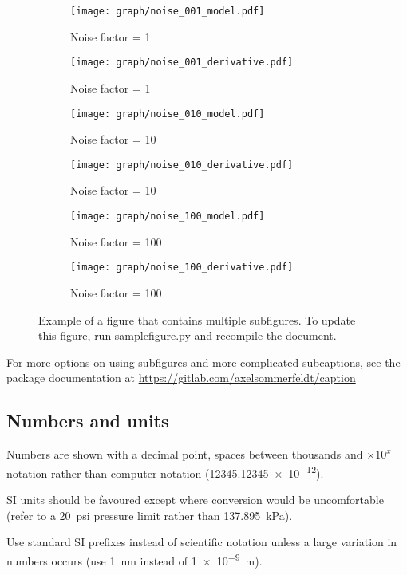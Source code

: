 \begin{figure}[htbp]
	\begin{subfigure}[b]{0.5\textwidth}
		\centering
    \texttt{[image: graph/noise\_001\_model.pdf]}
		\caption{Noise factor = \num{1}}\label{fig:1a}
	\end{subfigure}\hfill  
	\begin{subfigure}[b]{0.5\textwidth}
		\centering
    \texttt{[image: graph/noise\_001\_derivative.pdf]}
		\caption{Noise factor = \num{1}}\label{fig:1b}
	\end{subfigure}\hfill
	\begin{subfigure}[b]{0.5\textwidth}
		\centering
    \texttt{[image: graph/noise\_010\_model.pdf]}
		\caption{Noise factor = \num{10}}\label{fig:1c}
	\end{subfigure}\hfill
	\begin{subfigure}[b]{0.5\textwidth}
		\centering
    \texttt{[image: graph/noise\_010\_derivative.pdf]}
		\caption{Noise factor = \num{10}}\label{fig:1d}
	\end{subfigure}\hfill
	\begin{subfigure}[b]{0.5\textwidth}
		\centering
    \texttt{[image: graph/noise\_100\_model.pdf]}
		\caption{Noise factor = \num{100}}\label{fig:1e}
	\end{subfigure}\hfill
	\begin{subfigure}[b]{0.5\textwidth}
		\centering
    \texttt{[image: graph/noise\_100\_derivative.pdf]}
		\caption{Noise factor = \num{100}}\label{fig:1f}
	\end{subfigure}
	\caption[Short caption which will be in the table of figures]{Example of a figure that contains multiple subfigures.  To update this figure, run samplefigure.py and recompile the document.}
	\label{fig:subcaptionfigure}
\end{figure}

For more options on using subfigures and more complicated subcaptions, see the package documentation at \url{https://gitlab.com/axelsommerfeldt/caption} 

\subsection{Numbers and units}
Numbers are shown with a decimal point, spaces between thousands and $\times 10^x$ notation rather than computer notation (\num{12345.12345e-12}).

SI units should be favoured except where conversion would be
uncomfortable (refer to a \SI{20}{psi} pressure limit rather than
\SI{137.895}{\kilo\pascal}).

Use standard SI prefixes instead of scientific notation unless a large variation in
numbers occurs (use \SI{1}{\nano\meter} instead of \SI{1e-9}{\meter}).
